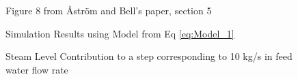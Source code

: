         \begin{figure}[ht]
            \begin{center}
                
                Figure 8 from \r{A}str\"{o}m and Bell's paper, section 5 \cite{Astrom}
                
                
                Simulation Results using Model from Eq \eqref{eq:Model_1}
                
                \caption{Steam Level Contribution to a step corresponding to 10 kg/s in feed water flow rate}
                \label{fig:Fig8C}
            \end{center}
        \end{figure}  %
        
